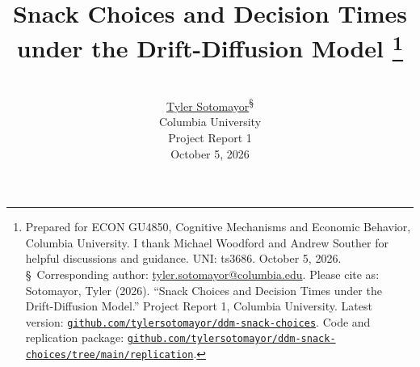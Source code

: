 
\newcommand{\papershorttitle}{Snack Choices and Decision Times}
\newcommand{\paperfulltitle}{Snack Choices and Decision Times under the Drift-Diffusion Model}
\newcommand{\paperauthor}{Tyler Sotomayor}
\newcommand{\paperpdfsubject}{ECON GU4850 Project Report 1}
\newcommand{\paperdate}{October 2026}
\newcommand{\paperyear}{2026}
\newcommand{\paperinstitution}{Columbia University}
\newcommand{\paperdepartment}{Columbia University, Department of Economics}
\newcommand{\papercourse}{ECON GU4850}
\newcommand{\papercoursetitle}{Cognitive Mechanisms \& Economic Behavior}
\newcommand{\paperterm}{Fall 2026}
\newcommand{\paperreport}{Project Report 1}
\newcommand{\paperfulldate}{October 5, 2026}
\newcommand{\paperlatesturl}{https://github.com/tylersotomayor/ddm-snack-choices/blob/main/output/pdf/project-1-report.pdf}
\newcommand{\paperlatesttext}{github.com/tylersotomayor/ddm-snack-choices}
\newcommand{\paperrepourl}{https://github.com/tylersotomayor/ddm-snack-choices}
\newcommand{\paperreplicationurl}{https://github.com/tylersotomayor/ddm-snack-choices/tree/main/replication/project-1-replication}
\newcommand{\paperreplicationtext}{github.com/tylersotomayor/ddm-snack-choices/tree/main/replication}

\title{\huge\bfseries Snack Choices and Decision Times%
  \\[0.3em] under the Drift-Diffusion Model%
  \thanks{Prepared for ECON GU4850, Cognitive Mechanisms and Economic Behavior,
  Columbia University. I thank Michael Woodford and Andrew Souther for helpful
  discussions and guidance. UNI: ts3686. October 5, 2026.
  \S~Corresponding author:
  \href{mailto:tyler.sotomayor@columbia.edu}{tyler.sotomayor@columbia.edu}.
  Please cite as: Sotomayor, Tyler (\paperyear).
  ``\paperfulltitle.''
  Project Report 1, \paperinstitution. Latest version:
  \href{\paperlatesturl}{\nolinkurl{\paperlatesttext}}.
  Code and replication package:
  \href{\paperreplicationurl}{\nolinkurl{\paperreplicationtext}}.}}

\author{%
  \vspace{-1.2em}\\
  {\Large
  \href{https://tylersotomayor.com}{\paperauthor}\textsuperscript{\S}}
  \\[1.5em]
  {\Large \paperinstitution} \\[1.5em]
  {\normalsize \paperreport} \\[0.6em]
  {\normalsize \paperfulldate}
}

\date{\vspace{-3em}}
